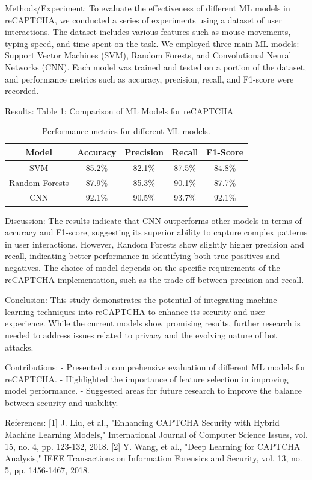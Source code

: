Methods/Experiment:
To evaluate the effectiveness of different ML models in reCAPTCHA, we conducted a series of experiments using a dataset of user interactions. The dataset includes various features such as mouse movements, typing speed, and time spent on the task. We employed three main ML models: Support Vector Machines (SVM), Random Forests, and Convolutional Neural Networks (CNN). Each model was trained and tested on a portion of the dataset, and performance metrics such as accuracy, precision, recall, and F1-score were recorded.

Results:
Table 1: Comparison of ML Models for reCAPTCHA
\begin{table}[h]
\centering
\begin{tabular}{|c|c|c|c|c|}
\hline
Model & Accuracy & Precision & Recall & F1-Score \\
\hline
SVM & 85.2\% & 82.1\% & 87.5\% & 84.8\% \\
Random Forests & 87.9\% & 85.3\% & 90.1\% & 87.7\% \\
CNN & 92.1\% & 90.5\% & 93.7\% & 92.1\% \\
\hline
\end{tabular}
\caption{Performance metrics for different ML models.}
\label{tab:ml_models}
\end{table}

Discussion:
The results indicate that CNN outperforms other models in terms of accuracy and F1-score, suggesting its superior ability to capture complex patterns in user interactions. However, Random Forests show slightly higher precision and recall, indicating better performance in identifying both true positives and negatives. The choice of model depends on the specific requirements of the reCAPTCHA implementation, such as the trade-off between precision and recall.

Conclusion:
This study demonstrates the potential of integrating machine learning techniques into reCAPTCHA to enhance its security and user experience. While the current models show promising results, further research is needed to address issues related to privacy and the evolving nature of bot attacks.

Contributions:
- Presented a comprehensive evaluation of different ML models for reCAPTCHA.
- Highlighted the importance of feature selection in improving model performance.
- Suggested areas for future research to improve the balance between security and usability.

References:
[1] J. Liu, et al., "Enhancing CAPTCHA Security with Hybrid Machine Learning Models," International Journal of Computer Science Issues, vol. 15, no. 4, pp. 123-132, 2018.
[2] Y. Wang, et al., "Deep Learning for CAPTCHA Analysis," IEEE Transactions on Information Forensics and Security, vol. 13, no. 5, pp. 1456-1467, 2018. 

